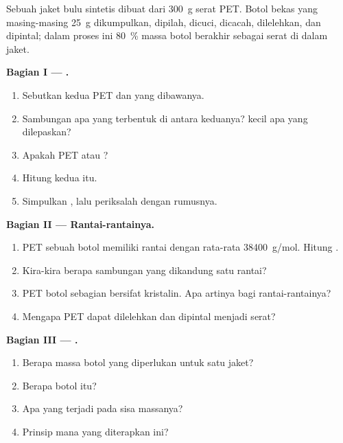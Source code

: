 \begin{problem}
\label{pb:g12:polymers:1}
Sebuah jaket bulu sintetis dibuat dari \qty{300}{g} serat PET. Botol
bekas yang masing-masing \qty{25}{g} dikumpulkan, dipilah, dicuci,
dicacah, dilelehkan, dan dipintal; dalam proses ini \qty{80}{\percent}
massa botol berakhir sebagai serat di dalam jaket.

\medskip
\noindent\textbf{Bagian I --- .}
\begin{enumerate}
  \item Sebutkan kedua  PET dan  yang dibawanya.
  \item Sambungan apa yang terbentuk di antara keduanya?  kecil
        apa yang dilepaskan?
  \item Apakah PET  atau ?
  \item Hitung  kedua  itu.
  \item Simpulkan   , lalu periksalah
        dengan rumusnya.
\end{enumerate}

\medskip
\noindent\textbf{Bagian II --- Rantai-rantainya.}
\begin{enumerate}[resume]
  \item PET sebuah botol memiliki rantai dengan  rata-rata
        \qty{38400}{g/mol}. Hitung .
  \item Kira-kira berapa sambungan  yang dikandung satu rantai?
  \item PET botol sebagian bersifat kristalin. Apa artinya bagi
        rantai-rantainya?
  \item Mengapa PET dapat dilelehkan dan dipintal menjadi serat?
\end{enumerate}

\medskip
\noindent\textbf{Bagian III --- .}
\begin{enumerate}[resume]
  \item Berapa massa botol yang diperlukan untuk satu jaket?
  \item Berapa botol itu?
  \item Apa yang terjadi pada sisa massanya?
  \item Prinsip  mana yang diterapkan  ini?
\end{enumerate}


\end{problem}
